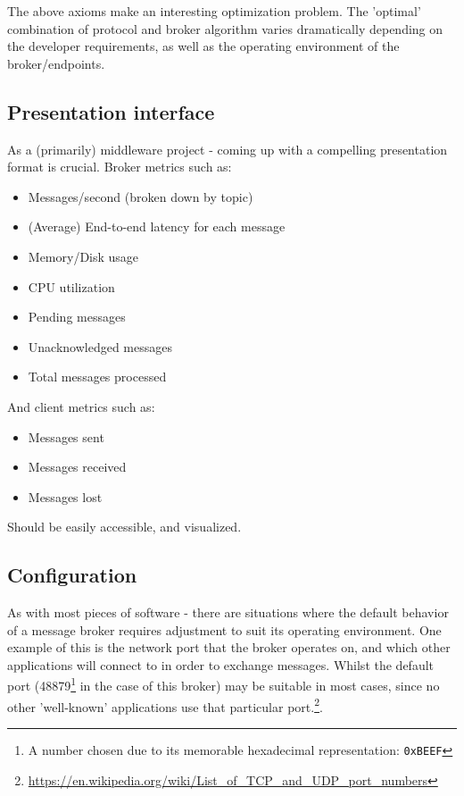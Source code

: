 The above axioms make an interesting optimization problem. The 'optimal' combination
of protocol and broker algorithm varies dramatically depending on the developer
requirements, as well as the operating environment of the broker/endpoints.

\subsection{Presentation interface}
\label{sub:presentation}

As a (primarily) middleware project - coming up with a compelling presentation
format is crucial. Broker metrics such as:

\begin{itemize}
  \item Messages/second (broken down by topic)
  \item (Average) End-to-end latency for each message
  \item Memory/Disk usage
  \item CPU utilization
  \item Pending messages
  \item Unacknowledged messages
  \item Total messages processed
\end{itemize}

And client metrics such as:

\begin{itemize}
  \item Messages sent
  \item Messages received
  \item Messages lost
\end{itemize}

Should be easily accessible, and visualized.

\subsection{Configuration}
\label{sub:Configuration}

As with most pieces of software - there are situations where the default behavior of a message broker requires adjustment to suit its operating environment. One example of this is the network port that the broker operates on, and which other applications will connect to in order to exchange messages. Whilst the default port (48879\footnote{A number chosen due to its memorable hexadecimal representation: \texttt{0xBEEF}} in the case of this broker) may be suitable in most cases, since no other 'well-known' applications use that particular port.\footnote{\url{https://en.wikipedia.org/wiki/List_of_TCP_and_UDP_port_numbers}}.

